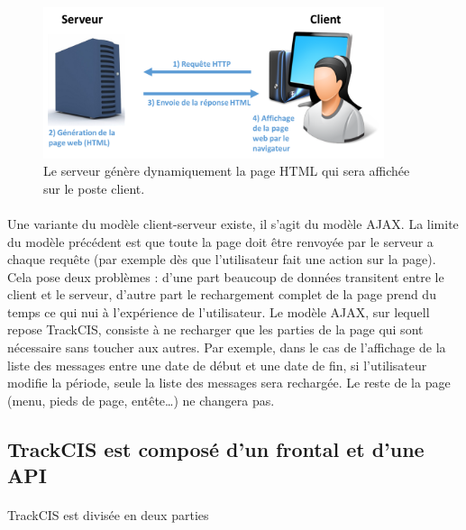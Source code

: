 			\begin{figure}[H]
				\centering
				\includegraphics[width=10cm]{../img/part3/client_serveur.png}
				\caption{\label{modele_donnee} Le serveur génère dynamiquement la page
				HTML qui sera affichée sur le poste client.}
			\end{figure}
			
			
			
			\paragraph{}%
			Une variante du modèle client-serveur existe, il s'agit du modèle AJAX. La
			limite du modèle précédent est que toute la page doit être renvoyée par le
			serveur a chaque requête (par exemple dès que l'utilisateur fait une action
			sur la page). Cela pose deux problèmes : d'une part beaucoup de données
			transitent entre le client et le serveur, d'autre part le rechargement
			complet de la page prend du temps ce qui nui à l'expérience de l'utilisateur.
			Le modèle AJAX, sur lequell repose TrackCIS, consiste à ne recharger que les
			parties de la page qui sont nécessaire sans toucher aux autres. Par exemple,
			dans le cas de l'affichage de la liste des messages entre une date de début
			et une date de fin, si l'utilisateur modifie la période, seule la liste des
			messages sera rechargée. Le reste de la page (menu, pieds de page,
			entête\ldots) ne changera pas.
			
		\subsection{TrackCIS est composé d'un frontal et d'une API}
			\paragraph{}%
			TrackCIS est divisée en deux parties
			
